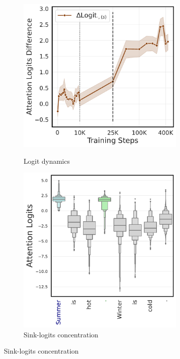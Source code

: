 \begin{figure}[h]
    \centering
    \hfill
    \begin{subfigure}[t]{0.32\textwidth}
        \centering 
        \caption{\small Logit dynamics}
        \includegraphics[width=0.9\textwidth]{Figures/olmo/attention_logits.pdf}
        \label{fig:attention_logits_olmo_dynamic}
    \end{subfigure}
    \hfill
    \begin{subfigure}[t]{0.32\textwidth}
        \centering 
        \caption{\small Sink-logits concentration}
        \includegraphics[width=0.9\textwidth]{Figures/olmo/attention_logits_on_test.pdf}

\end{subfigure}
\end{figure}
